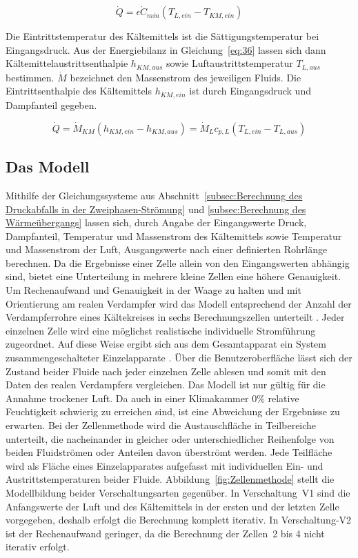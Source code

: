\begin{equation}
\label{eq:35}
\dot{Q} = \epsilon \dot{C}_{min} (T_{L,ein} - T_{KM,ein})
\end{equation}

Die Eintrittstemperatur des Kältemittels ist die Sättigungstemperatur bei Eingangsdruck. Aus der Energiebilanz in Gleichung~\ref{eq:36} lassen sich dann Kältemittelaustrittsenthalpie $h_{KM,aus}$ sowie Luftaustrittstemperatur $T_{L,aus}$ bestimmen. $\dot{M}$ bezeichnet den Massenstrom des jeweiligen Fluids. Die Eintrittsenthalpie des Kältemittels $h_{KM,ein}$ ist durch Eingangsdruck und Dampfanteil gegeben.

\begin{equation}
\label{eq:36}
\dot{Q} = \dot{M}_{KM} (h_{KM,ein} - h_{KM,aus}) = \dot{M}_{L} c_{p,L}(T_{L,ein} - T_{L,aus})
\end{equation}




\subsection{Das Modell}
\label{subsec:Das Modell}

Mithilfe der Gleichungssysteme aus Abschnitt~\ref{subsec:Berechnung des Druckabfalls in der Zweiphasen-Strömung} und \ref{subsec:Berechnung des Wärmeübergangs} lassen sich, durch Angabe der Eingangswerte Druck, Dampfanteil, Temperatur und Massenstrom des Kältemittels sowie Temperatur und Massenstrom der Luft, Ausgangswerte nach einer definierten Rohrlänge berechnen. Da die Ergebnisse einer Zelle allein von den Eingangswerten abhängig sind, bietet eine Unterteilung in mehrere kleine Zellen eine höhere Genauigkeit. Um Rechenaufwand und Genauigkeit in der Waage zu halten und mit Orientierung am realen Verdampfer wird das Modell entsprechend der Anzahl der Verdampferrohre eines Kältekreises in sechs Berechnungszellen unterteilt \cite{LehrstuhlfurWarmeundStoffubertragung.b}. Jeder einzelnen Zelle wird eine möglichst realistische individuelle Stromführung zugeordnet. Auf diese Weise ergibt sich aus dem Gesamtapparat ein System zusammengeschalteter Einzelapparate \cite{SpringerVerlagGmbH.2013}.
Über die Benutzeroberfläche lässt sich der Zustand beider Fluide nach jeder einzelnen Zelle ablesen und somit mit den Daten des realen Verdampfers vergleichen.
Das Modell ist nur gültig für die Annahme trockener Luft. Da auch in einer Klimakammer \unit{0}{\%} relative Feuchtigkeit schwierig zu erreichen sind, ist eine Abweichung der Ergebnisse zu erwarten. \newline
Bei der Zellenmethode wird die Austauschfläche in Teilbereiche unterteilt, die nacheinander in gleicher oder unterschiedlicher Reihenfolge von beiden Fluidströmen oder Anteilen davon überströmt werden. Jede Teilfläche wird als Fläche eines Einzelapparates aufgefasst mit individuellen Ein- und Austrittstemperaturen beider Fluide. Abbildung~\ref{fig:Zellenmethode} stellt die Modellbildung beider Verschaltungsarten gegenüber. In Verschaltung~V1 sind die Anfangswerte der Luft und des Kältemittels in der ersten und der letzten Zelle vorgegeben, deshalb erfolgt die Berechnung komplett iterativ. In Verschaltung-V2 ist der Rechenaufwand geringer, da die Berechnung der Zellen~2 bis 4 nicht iterativ erfolgt.

